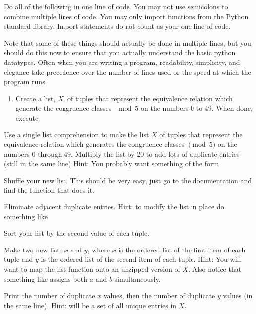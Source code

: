 \begin{problem}
Do all of the following in one line of code.
You may not use semicolons to combine multiple lines of code.
You may only import functions from the Python standard library.
Import statements do not count as your one line of code.

Note that some of these things should actually be done in multiple lines, but you should do this now to ensure that you actually understand the basic python datatypes.
Often when you are writing a program, readability, simplicity, and elegance take precedence over the number of lines used or the speed at which the program runs.
\begin{enumerate}
\item Create a list, $X$, of tuples that represent the equivalence relation which generate
the congruence classes $\mod 5$ on the numbers 0 to 49.  When done, execute
\end{enumerate}

\item Use a single list comprehension to make the list $X$ of tuples that represent the equivalence relation which generates the congruence classes $\pmod 5$ on the numbers 0 through 49.
Multiply the list by 20 to add lots of duplicate entries (still in the same line)
Hint: You probably want something of the form 

\item Shuffle your new list. This should be very easy, just go to the documentation and find the function that does it.

\item Eliminate adjacent duplicate entries. 
Hint: to modify the list in place do something like 

\item Sort your list by the second value of each tuple.

\item Make two new lists $x$ and $y$, where $x$ is the ordered list of the first item of each tuple and $y$ is the ordered list of the second item of each tuple.
Hint: You will want to map the list function onto an unzipped version of $X$.
Also notice that something like  assigns both $a$ and $b$ simultaneously.

\item Print the number of duplicate $x$ values, then the number of duplicate $y$ values (in the same line).
Hint:  will be a set of all unique entries in $X$.


\end{problem}
